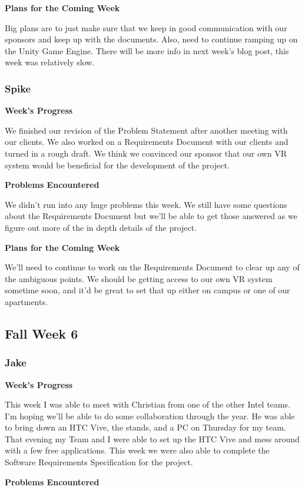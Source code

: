 \documentclass[10pt,journal,compsoc,onecolumn, draftclsnofoot]{IEEEtran}
\begin{document}
\noindent \textbf{Plans for the Coming Week}

Big plans are to just make sure that we keep in good communication with our sponsors and keep up with the documents.  Also, need to continue ramping up on the Unity Game Engine.  There will be more info in next week's blog post, this week was relatively slow.

\subsubsection{Spike}
\noindent \textbf{Week's Progress}

We finished our revision of the Problem Statement after another meeting with our clients. We also worked on a Requirements Document with our clients and turned in a rough draft. We think we convinced our sponsor that our own VR system would be beneficial for the development of the project.

\noindent \textbf{Problems Encountered}

We didn't run into any huge problems this week. We still have some questions about the Requirements Document but we'll be able to get those answered as we figure out more of the in depth details of the project.

\noindent \textbf{Plans for the Coming Week}

We'll need to continue to work on the Requirements Document to clear up any of the ambiguous points. We should be getting access to our own VR system sometime soon, and it'd be great to set that up either on campus or one of our apartments.

\subsection{Fall Week 6}
\subsubsection{Jake}
\noindent \textbf{Week's Progress}

This week I was able to meet with Christian from one of the other Intel teams. I'm hoping we'll be able to do some collaboration through the year. He was able to bring down an HTC Vive, the stands, and a PC on Thursday for my team. That evening my Team and I were able to set up the HTC Vive and mess around with a few free applications. This week we were also able to complete the Software Requirements Specification for the project.

\noindent \textbf{Problems Encountered}
\end{document}
